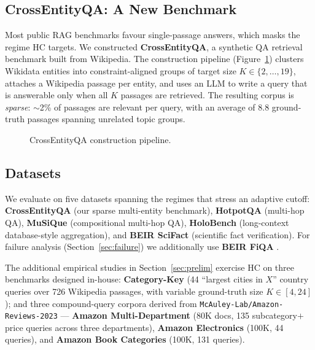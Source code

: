\documentclass[letterpaper]{article}
\begin{document}
\subsection{CrossEntityQA: A New Benchmark}
Most public RAG benchmarks favour single-passage answers, which masks
the regime HC targets. We constructed \textbf{CrossEntityQA}, a
synthetic QA retrieval benchmark built from Wikipedia. The construction
pipeline (Figure~\ref{fig:ceqa}) clusters Wikidata entities into
constraint-aligned groups of target size $K \in \{2, \dots, 19\}$,
attaches a Wikipedia passage per entity, and uses an LLM to write a
query that is answerable only when all $K$ passages are retrieved.
The resulting corpus is \emph{sparse}: $\sim$2\% of passages are
relevant per query, with an average of 8.8 ground-truth passages
spanning unrelated topic groups.

\begin{figure}[t]
\centering
\caption{CrossEntityQA construction pipeline.}
\label{fig:ceqa}
\end{figure}

\subsection{Datasets}
We evaluate on five datasets spanning the regimes that stress an
adaptive cutoff: \textbf{CrossEntityQA} (our sparse multi-entity
benchmark), \textbf{HotpotQA} \cite{yang2018hotpotqa} (multi-hop QA),
\textbf{MuSiQue} \cite{trivedi2022musique} (compositional multi-hop
QA), \textbf{HoloBench} \cite{maekawa2024holobench} (long-context
database-style aggregation), and \textbf{BEIR SciFact}
\cite{thakur2021beir,wadden2020scifact} (scientific fact
verification). For failure analysis (Section~\ref{sec:failure}) we
additionally use \textbf{BEIR FiQA} \cite{thakur2021beir}.

The additional empirical studies in Section~\ref{sec:prelim}
exercise HC on three benchmarks designed in-house:
\textbf{Category-Key} (44 ``largest cities in $X$'' country queries
over 726 Wikipedia passages, with variable ground-truth size
$K \in [4,24]$); and three compound-query corpora derived from
\texttt{McAuley-Lab/Amazon-Reviews-2023} --- \textbf{Amazon
Multi-Department} (80K docs, 135 subcategory$+$price queries across
three departments), \textbf{Amazon Electronics} (100K, 44 queries),
and \textbf{Amazon Book Categories} (100K, 131 queries).
\end{document}
